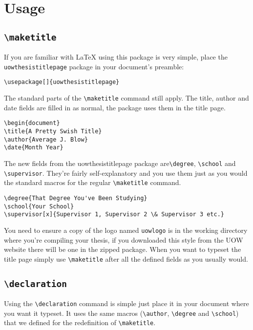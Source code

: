 \documentclass[12pt,oneside]{article}
\newcommand{\oporcom}[1]{\texttt{\color{RoyalBlue}#1}} %
\begin{document}
\section{Usage}
\subsection*{\oporcom{\textbackslash{}maketitle}}
If you are familiar with LaTeX using this package is very simple, place the \texttt{uowthesistitlepage} package in your document's preamble:
\begin{verbatim}
\usepackage[]{uowthesistitlepage} 
\end{verbatim}
The standard parts of the \oporcom{\textbackslash{}maketitle} command still apply. The title, author and date fields are filled in as normal, the package uses them in the title page.
\begin{verbatim}
\begin{document}
\title{A Pretty Swish Title} 
\author{Average J. Blow}
\date{Month Year}
\end{verbatim}
The new fields from the uowthesistitlepage package are\oporcom{\textbackslash{}degree}, \oporcom{\textbackslash{}school} and \oporcom{\textbackslash{}supervisor}. They're fairly self-explanatory and you use them just as you would the standard macros for the regular \oporcom{\textbackslash{}maketitle} command.  
\begin{verbatim}
\degree{That Degree You've Been Studying} 
\school{Your School} 
\supervisor[x]{Supervisor 1, Supervisor 2 \& Supervisor 3 etc.}
\end{verbatim}
You need to ensure a copy of the logo named \texttt{uow\textunderscore{}logo} is in the working directory where you're compiling your thesis, if you downloaded this style from the UOW website there will be one in the zipped package. When you want to typeset the title page simply use \oporcom{\textbackslash{}maketitle} after all the defined fields as you usually would.

\subsection*{\oporcom{\textbackslash{}declaration}}
Using the \oporcom{\textbackslash{}declaration} command is simple just place it in your document where you want it typeset. It uses the same macros (\oporcom{\textbackslash{}author}, \oporcom{\textbackslash{}degree} and \oporcom{\textbackslash{}school}) that we defined for the redefinition of \oporcom{\textbackslash{}maketitle}. 
\end{document}
